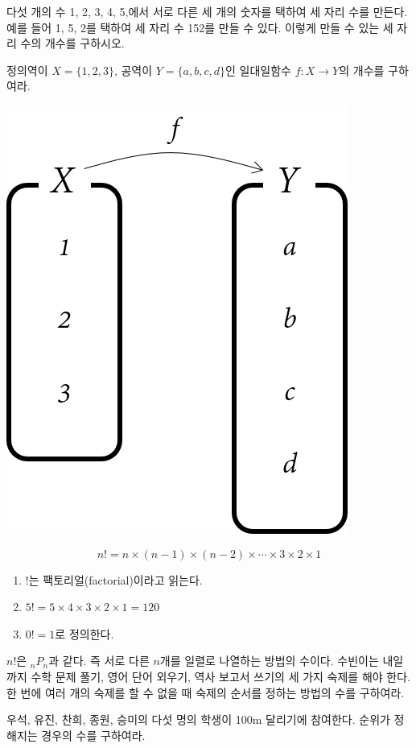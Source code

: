 \documentclass{oblivoir}
\begin{document}
%
\prob{}\label{perm6}
다섯 개의 수 1, 2, 3, 4, 5,에서 서로 다른 세 개의 숫자를 택하여 세 자리 수를 만든다.
예를 들어 1, 5, 2를 택하여 세 자리 수 152를 만들 수 있다.
이렇게 만들 수 있는 세 자리 수의 개수를 구하시오.

%
\prob{}\label{perm7}
정의역이 \(X=\{1,2,3\}\), 공역이 \(Y=\{a,b,c,d\}\)인 일대일함수 \(f:X\to Y\)의 개수를 구하여라.
\begin{center}
\includegraphics[width=.2\textwidth]{perm_7}
\end{center}


\newpage
\begin{mdframed}
%
\label{perm8}
\hspace{-.7em}
\[n!=n\times(n-1)\times(n-2)\times\cdots\times3\times2\times1\]
\end{mdframed}

%
\rema{}
\begin{enumerate}\label{perm9}
\item
\(!\)는 팩토리얼(factorial)이라고 읽는다.
\item
\(5!=5\times4\times3\times2\times1=120\)
\item
\(0!=1\)로 정의한다.
\end{enumerate}

\bigskip
\(n!\)은 \(_nP_n\)과 같다.
즉 서로 다른 \(n\)개를 일렬로 나열하는 방법의 수이다.
%
\prob{}\label{perm10}
수빈이는 내일까지 수학 문제 풀기, 영어 단어 외우기, 역사 보고서 쓰기의 세 가지 숙제를 해야 한다.
한 번에 여러 개의 숙제를 할 수 없을 때 숙제의 순서를 정하는 방법의 수를 구하여라.

%
\prob{}\label{perm11}
우석, 유진, 찬희, 종원, 승미의 다섯 명의 학생이 100m 달리기에 참여한다.
순위가 정해지는 경우의 수를 구하여라.
\end{document}
